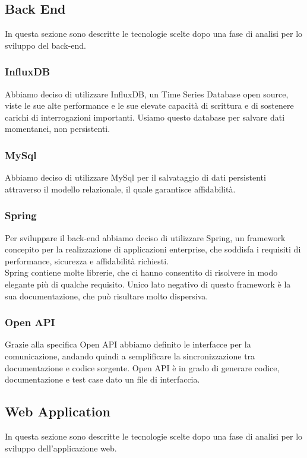 \documentclass[../manuale-sviluppatore.tex]{subfiles}
\begin{document}
\subsection{Back End}%
\label{sub:back-end}
In questa sezione sono descritte le tecnologie scelte dopo una fase di analisi per lo sviluppo del back-end.

\subsubsection{InfluxDB}%
\label{sub:influxDB}
Abbiamo deciso di utilizzare InfluxDB, un Time Series Database open source, viste le sue alte performance e le sue elevate capacità di scrittura e di sostenere carichi di interrogazioni 
importanti. Usiamo questo database per salvare dati momentanei, non persistenti.

\subsubsection{MySql}%
\label{sub:mysql}
Abbiamo deciso di utilizzare MySql per il salvataggio di dati persistenti attraverso il modello relazionale, il quale garantisce affidabilità.

\subsubsection{Spring}%
\label{sub:spring}
Per sviluppare il back-end abbiamo deciso di utilizzare Spring, un framework concepito per la realizzazione di applicazioni enterprise, che soddisfa i requisiti
di performance, sicurezza e affidabilità richiesti. \\
Spring contiene molte librerie, che ci hanno consentito di risolvere in modo elegante più di qualche requisito.
Unico lato negativo di questo framework è la sua documentazione, che può risultare molto dispersiva.

\subsubsection{Open API}%
\label{sub:open_api}
Grazie alla specifica Open API abbiamo definito le interfacce per la comunicazione, andando quindi a semplificare la sincronizzazione tra documentazione e codice sorgente.
Open API è in grado di generare codice, documentazione e test case dato un file di interfaccia.


\newpage
\subsection{Web Application}%
\label{sub:back-end}
In questa sezione sono descritte le tecnologie scelte dopo una fase di analisi per lo sviluppo dell'applicazione web.
\end{document}
